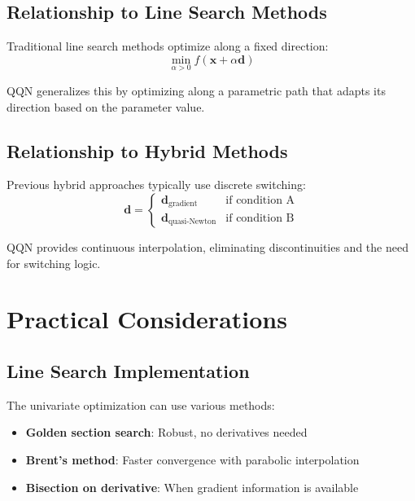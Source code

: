 \hypertarget{relationship-to-line-search-methods}{%
\subsection{Relationship to Line Search Methods}\label{relationship-to-line-search-methods}}

Traditional line search methods optimize along a fixed direction:
\[\min_{\alpha > 0} f(\mathbf{x} + \alpha \mathbf{d})\]

QQN generalizes this by optimizing along a parametric path that adapts its direction based on the parameter value.

\hypertarget{relationship-to-hybrid-methods}{%
\subsection{Relationship to Hybrid Methods}\label{relationship-to-hybrid-methods}}

Previous hybrid approaches typically use discrete switching:
\[\mathbf{d} = \begin{cases}
\mathbf{d}_{\text{gradient}} & \text{if condition A} \\
\mathbf{d}_{\text{quasi-Newton}} & \text{if condition B}
\end{cases}\]

QQN provides continuous interpolation, eliminating discontinuities and the need for switching logic.

\hypertarget{practical-considerations}{%
\section{Practical Considerations}\label{practical-considerations}}

\hypertarget{line-search-implementation}{%
\subsection{Line Search Implementation}\label{line-search-implementation}}

The univariate optimization can use various methods:

\begin{itemize}
\tightlist
\item
  \textbf{Golden section search}: Robust, no derivatives needed
\item
  \textbf{Brent's method}: Faster convergence with parabolic interpolation
\item
  \textbf{Bisection on derivative}: When gradient information is available
\end{itemize}

